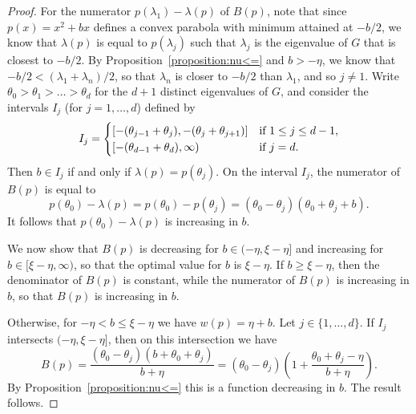 \documentclass[a4paper,11pt]{article}
\theoremstyle{definition}
\begin{document}
\begin{proof}
    For the numerator $p(\lambda_1)-\lambda(p)$ of $B(p)$, note that since $p(x)=x^2+bx$ defines a convex parabola with minimum attained at $-b/2$, we know that $\lambda(p)$ is equal to $p(\lambda_j)$ such that $\lambda_j$ is the eigenvalue of $G$ that is closest to $-b/2$. By Proposition~\ref{proposition:nu<=} and $b> -\eta$, we know that $-b/2< (\lambda_1+\lambda_n)/2$, so that $\lambda_n$ is closer to $-b/2$ than $\lambda_1$, and so $j\ne 1$. Write $\theta_0>\theta_1>\dots>\theta_d$ for the $d+1$ distinct eigenvalues of $G$, and consider the intervals $I_j$ (for $j=1,\dots,d$) defined by
    \[
    I_j =\begin{cases}
        [-(\theta_{j-1}+\theta_j),-(\theta_j+\theta_{j+1})] &$if $1\le j \le d-1,\\
        [-(\theta_{d-1}+\theta_d),\infty) &$if $j=d.
    \end{cases}
    \]
    Then $b\in I_j$ if and only if $\lambda(p)=p(\theta_j)$. On the interval $I_j$, the numerator of $B(p)$ is equal to
    $$p(\theta_0)-\lambda(p)=p(\theta_0)-p(\theta_j)=(\theta_0-\theta_j)(\theta_0+\theta_j+b).$$
    It follows that $p(\theta_0)-\lambda(p)$ is increasing in $b$.

    We now show that $B(p)$ is decreasing for $b\in (-\eta , \xi-\eta]$ and increasing for $b\in [\xi-\eta,\infty)$, so that the optimal value for $b$ is $\xi-\eta$. If $b\ge \xi-\eta$, then the denominator of $B(p)$ is constant, while the numerator of $B(p)$ is increasing in $b$, so that $B(p)$ is increasing in $b$.

    Otherwise, for $-\eta < b \le \xi -\eta$ we have $w(p)=\eta+b$. Let $j\in\{1,\dots,d\}$. If $I_j$ intersects $(-\eta,\xi-\eta]$, then on this intersection we have
    $$B(p)=\frac{(\theta_0-\theta_j)(b+\theta_0+\theta_j)}{b+\eta}=(\theta_0-\theta_j) \left ( 1+\frac{\theta_0+\theta_j-\eta}{b+\eta} \right ).$$
    By Proposition~\ref{proposition:nu<=} this is a function decreasing in $b$. The result follows.
\end{proof}


\end{document}
